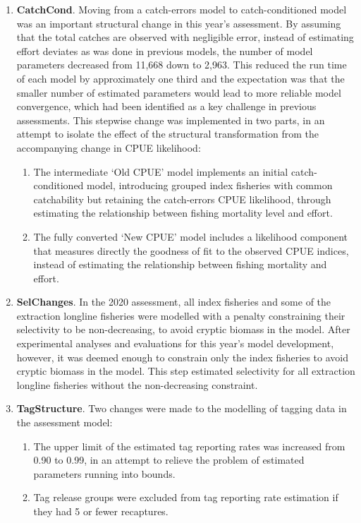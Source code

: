\begin{enumerate}
  \item \textbf{CatchCond}. Moving from a catch-errors model to catch-conditioned model was an important structural change in this year's assessment. By assuming that the total catches are observed with negligible error, instead of estimating effort deviates as was done in previous models, the number of model parameters decreased from 11,668 down to 2,963. This reduced the run time of each model by approximately one third and the expectation was that the smaller number of estimated parameters would lead to more reliable model convergence, which had been identified as a key challenge in previous assessments. This stepwise change was implemented in two parts, in an attempt to isolate the effect of the structural transformation from the accompanying change in CPUE likelihood:
  \begin{enumerate}
    \item The intermediate `Old CPUE' model implements an initial catch-conditioned model, introducing grouped index fisheries with common catchability but retaining the catch-errors CPUE likelihood, through estimating the relationship between fishing mortality level and effort.
    \item The fully converted `New CPUE' model includes a likelihood component that measures directly the goodness of fit to the observed CPUE indices, instead of estimating the relationship between fishing mortality and effort.
  \end{enumerate}

  \item \textbf{SelChanges}. In the 2020 assessment, all index fisheries and some of the extraction longline fisheries were modelled with a penalty constraining their selectivity to be non-decreasing, to avoid cryptic biomass in the model. After experimental analyses and evaluations for this year's model development, however, it was deemed enough to constrain only the index fisheries to avoid cryptic biomass in the model. This step estimated selectivity for all extraction longline fisheries without the non-decreasing constraint.

  \item \textbf{TagStructure}. Two changes were made to the modelling of tagging data in the assessment model:
  \begin{enumerate}
    \item The upper limit of the estimated tag reporting rates was increased from 0.90 to 0.99, in an attempt to relieve the problem of estimated parameters running into bounds.
    \item Tag release groups were excluded from tag reporting rate estimation if they had 5 or fewer recaptures.
  \end{enumerate}


\end{enumerate}
